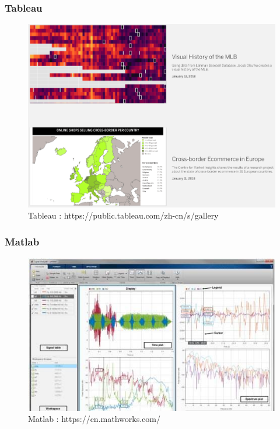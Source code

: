 \documentclass{beamer}
\begin{document}
\begin{frame}
  \frametitle{Tableau}
  \begin{figure}
    \begin{center}
      \includegraphics[width=0.7\linewidth]{images//tab.png}
      \caption{Tableau : https://public.tableau.com/zh-cn/s/gallery}
      \label{Fig:7}
    \end{center}
  \end{figure}

\end{frame}

\begin{frame}
  \frametitle{Matlab}
  \begin{figure}
    \begin{center}
      \includegraphics[width=0.7\linewidth]{images//matlab.jpeg}
      \caption{Matlab : https://cn.mathworks.com/}
      \label{Fig:8}
    \end{center}
  \end{figure}

\end{frame}
\end{document}
